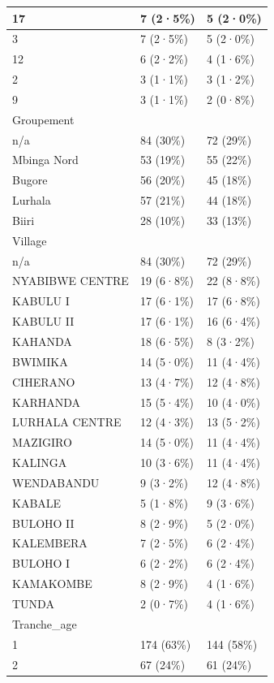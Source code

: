 \documentclass[
]{book}
\begin{document}
\begin{tabular}{l|l|l}
\hline
17 & 7 (2·5\%) & 5 (2·0\%)\\
\hline
3 & 7 (2·5\%) & 5 (2·0\%)\\
\hline
12 & 6 (2·2\%) & 4 (1·6\%)\\
\hline
2 & 3 (1·1\%) & 3 (1·2\%)\\
\hline
9 & 3 (1·1\%) & 2 (0·8\%)\\
\hline
Groupement &  & \\
\hline
n/a & 84 (30\%) & 72 (29\%)\\
\hline
Mbinga Nord & 53 (19\%) & 55 (22\%)\\
\hline
Bugore & 56 (20\%) & 45 (18\%)\\
\hline
Lurhala & 57 (21\%) & 44 (18\%)\\
\hline
Biiri & 28 (10\%) & 33 (13\%)\\
\hline
Village &  & \\
\hline
n/a & 84 (30\%) & 72 (29\%)\\
\hline
NYABIBWE CENTRE & 19 (6·8\%) & 22 (8·8\%)\\
\hline
KABULU I & 17 (6·1\%) & 17 (6·8\%)\\
\hline
KABULU II & 17 (6·1\%) & 16 (6·4\%)\\
\hline
KAHANDA & 18 (6·5\%) & 8 (3·2\%)\\
\hline
BWIMIKA & 14 (5·0\%) & 11 (4·4\%)\\
\hline
CIHERANO & 13 (4·7\%) & 12 (4·8\%)\\
\hline
KARHANDA & 15 (5·4\%) & 10 (4·0\%)\\
\hline
LURHALA CENTRE & 12 (4·3\%) & 13 (5·2\%)\\
\hline
MAZIGIRO & 14 (5·0\%) & 11 (4·4\%)\\
\hline
KALINGA & 10 (3·6\%) & 11 (4·4\%)\\
\hline
WENDABANDU & 9 (3·2\%) & 12 (4·8\%)\\
\hline
KABALE & 5 (1·8\%) & 9 (3·6\%)\\
\hline
BULOHO II & 8 (2·9\%) & 5 (2·0\%)\\
\hline
KALEMBERA & 7 (2·5\%) & 6 (2·4\%)\\
\hline
BULOHO I & 6 (2·2\%) & 6 (2·4\%)\\
\hline
KAMAKOMBE & 8 (2·9\%) & 4 (1·6\%)\\
\hline
TUNDA & 2 (0·7\%) & 4 (1·6\%)\\
\hline
Tranche\_age &  & \\
\hline
1 & 174 (63\%) & 144 (58\%)\\
\hline
2 & 67 (24\%) & 61 (24\%)\\

\end{tabular}
\end{document}
